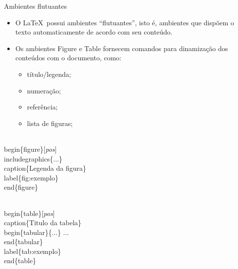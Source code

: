 \begin{frame}{Ambientes flutuantes}
    \begin{itemize}
    \item O \LaTeX\ possui ambientes ``flutuantes'', isto é, ambientes que dispõem o texto automaticamente de acordo com seu conteúdo.
    \item Os ambientes Figure e Table fornecem comandos para dinamização dos conteúdos com o documento, como:
        \begin{itemize}
        \item título/legenda;
        \item numeração;
        \item referência;
        \item lista de figuras;
        \end{itemize}
    \end{itemize}

    \begin{example}
        \begin{semiverbatim}
\\begin\{figure\}[\textit{pos}]
  \\includegraphics\{...\}
  \\caption\{Legenda da figura\}
  \\label\{fig:exemplo\}
\\end\{figure\}

\\begin\{table\}[\textit{pos}]
  \\caption\{Titulo da tabela\}
  \\begin\{tabular\}\{...\}
  ...
  \\end\{tabular\}
  \\label\{tab:exemplo\}
\\end\{table\}
\end{semiverbatim}
    \end{example}
\end{frame}



